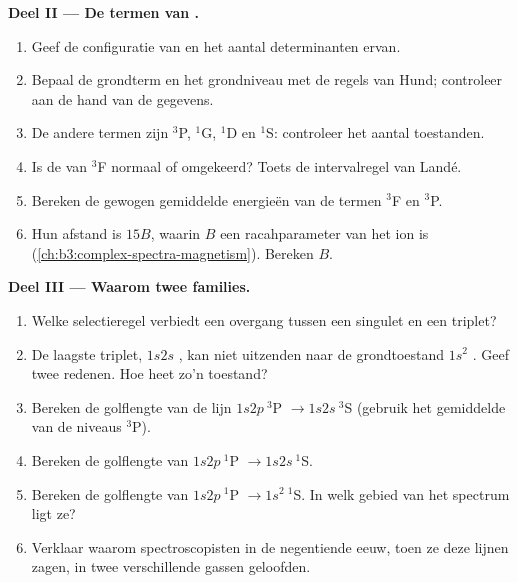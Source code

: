 \begin{problem}
\medskip\noindent\textbf{Deel II --- De termen van .}
\begin{enumerate}[resume]
  \item Geef de configuratie van  en het aantal determinanten
        ervan.
  \item Bepaal de grondterm en het grondniveau met de regels van Hund;
        controleer aan de hand van de gegevens.
  \item De andere termen zijn ${}^3$P, ${}^1$G, ${}^1$D en ${}^1$S: controleer het aantal
        toestanden.
  \item Is de  van ${}^3$F normaal of omgekeerd? Toets de
        intervalregel van Landé.
  \item Bereken de gewogen gemiddelde energieën van de termen ${}^3$F en ${}^3$P.
  \item Hun afstand is $15B$, waarin $B$ een racahparameter van het ion is
        (\cref{ch:b3:complex-spectra-magnetism}). Bereken $B$.
\end{enumerate}

\medskip\noindent\textbf{Deel III --- Waarom twee families.}
\begin{enumerate}[resume]
  \item Welke selectieregel verbiedt een overgang tussen een singulet en een
        triplet?
  \item De laagste triplet, $1s2s$ , kan niet uitzenden naar
        de grondtoestand $1s^2$ . Geef twee redenen. Hoe
        heet zo'n toestand?
  \item Bereken de golflengte van de lijn $1s2p\ {}^3$P $\to 1s2s\ {}^3$S (gebruik
        het gemiddelde van de niveaus ${}^3$P).
  \item Bereken de golflengte van $1s2p\ {}^1$P $\to 1s2s\ {}^1$S.
  \item Bereken de golflengte van $1s2p\ {}^1$P $\to 1s^2\ {}^1$S. In welk
        gebied van het spectrum ligt ze?
  \item Verklaar waarom spectroscopisten in de negentiende eeuw, toen ze
        deze lijnen zagen, in twee verschillende gassen geloofden.
\end{enumerate}


\end{problem}
